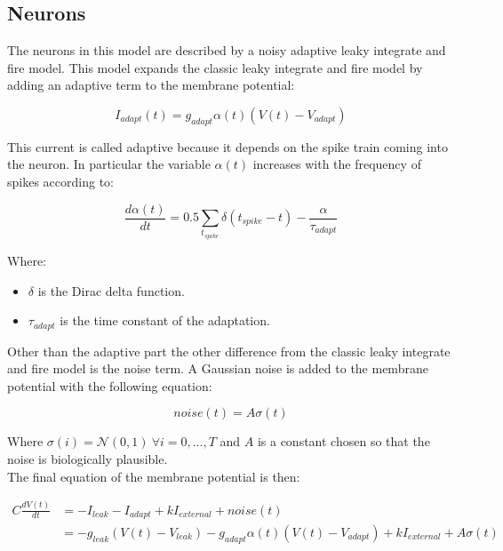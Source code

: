   \subsection{Neurons}
  The neurons in this model are described by a noisy adaptive leaky integrate and fire model.
  This model expands the classic leaky integrate and fire model by adding an adaptive term to the membrane potential:

  \begin{equation}
    I_{adapt}(t) = g_{adapt}\alpha(t)(V(t) - V_{adapt})
  \end{equation}

  This current is called adaptive because it depends on the spike train coming into the neuron.
  In particular the variable $\alpha(t)$ increases with the frequency of spikes according to:

  \begin{equation}
    \frac{d\alpha(t)}{dt} = 0.5\sum\limits_{t_{spike}}\delta(t_{spike} - t) - \frac{\alpha}{\tau_{adapt}}
  \end{equation}

  Where:

  \begin{multicols}{2}
    \begin{itemize}
      \item $\delta$ is the Dirac delta function.
      \item $\tau_{adapt}$ is the time constant of the adaptation.
    \end{itemize}
  \end{multicols}

  Other than the adaptive part the other difference from the classic leaky integrate and fire model is the noise term.
  A Gaussian noise is added to the membrane potential with the following equation:

  \begin{equation}
    noise(t) = A\sigma(t)
  \end{equation}

  Where $\sigma(i) = \mathcal{N}(0,1)\ \forall i = 0,\dots, T$ and $A$ is a constant chosen so that the noise is biologically plausible.\\
  The final equation of the membrane potential is then:

  \begin{align}
    C\frac{dV(t)}{dt} &= -I_{leak} - I_{adapt} + k I_{external} + noise(t)\\
                      &= -g_{leak}(V(t)-V_{leak}) - g_{adapt}\alpha(t)(V(t) - V_{adapt}) + k I_{external} + A\sigma(t)
    \label{eqs:neuron-model}
  \end{align}

